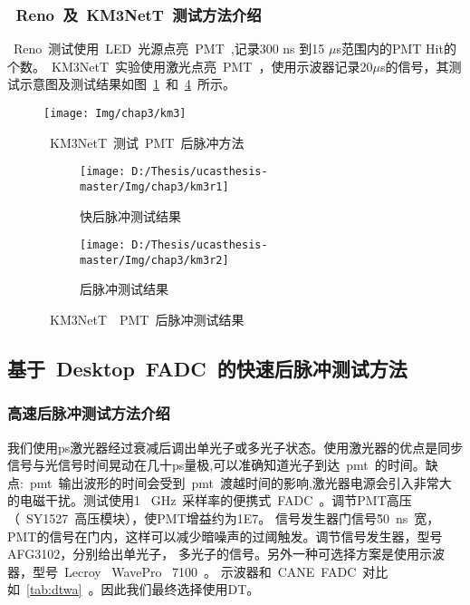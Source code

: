 \subsubsection{~Reno~及~KM3NetT~测试方法介绍}
~Reno~测试使用~LED~光源点亮~PMT~,记录300 ns 到15 $\mu$s范围内的PMT Hit的个数。~KM3NetT~实验使用激光点亮~PMT~，使用示波器记录20$\mu$s的信号，其测试示意图及测试结果如图~\ref{fig:km3}~和~\ref{fig:km3r}~所示。
 \begin{figure}[!htbp]
  \centering
   \texttt{[image: Img/chap3/km3]}
    \caption{~KM3NetT~测试~PMT~后脉冲方法}
  \label{fig:km3}
\end{figure}


\begin{figure}[!htbp]
  \centering
  \begin{subfigure}[b]{\MySubFactor\textwidth}
    \texttt{[image: D:/Thesis/ucasthesis-master/Img/chap3/km3r1]}
    \caption{快后脉冲测试结果}
    \label{fig:km3r_1}
  \end{subfigure}%
  \quad\quad\quad\quad%
  \begin{subfigure}[b]{\MySubFactor\textwidth}
    \texttt{[image: D:/Thesis/ucasthesis-master/Img/chap3/km3r2]}
    \caption{后脉冲测试结果}
    \label{fig:km3r_2}
  \end{subfigure}
  \caption{~KM3NetT~~PMT~后脉冲测试结果}
  \label{fig:km3r}
\end{figure}

\subsection{基于~Desktop~FADC~的快速后脉冲测试方法}
\subsubsection{高速后脉冲测试方法介绍}
我们使用ps激光器经过衰减后调出单光子或多光子状态。使用激光器的优点是同步信号与光信号时间晃动在几十ps量极,可以准确知道光子到达~pmt~的时间。缺点:~pmt~输出波形的时间会受到~pmt~渡越时间的影响,激光器电源会引入非常大的电磁干扰。测试使用1 ~GHz~采样率的便携式~FADC~。调节PMT高压（~SY1527~高压模块），使PMT增益约为1E7。 信号发生器门信号\~50~ns~宽，PMT的信号在门内，这样可以减少暗噪声的过阈触发。调节信号发生器，型号AFG3102，分别给出单光子，  多光子的信号。另外一种可选择方案是使用示波器，型号~Lecroy~ WavePro ~7100~。 示波器和~CANE~FADC~对比如~\ref{tab:dtwa}~。因此我们最终选择使用DT。

